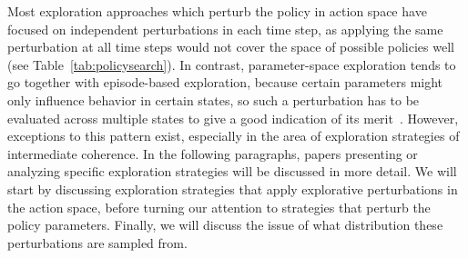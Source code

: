 Most exploration approaches which perturb the policy in action space have focused on independent perturbations in each time step, as applying the same perturbation at all time steps would not cover the space of possible policies well (see Table~\ref{tab:policysearch}). In contrast, parameter-space exploration tends to go together with episode-based exploration, because certain parameters might only influence behavior in certain states, so such a perturbation has to be evaluated across multiple states to give a good indication of its merit~. However, exceptions to this pattern exist, especially in the area of exploration strategies of intermediate coherence. In the following paragraphs, papers presenting or analyzing specific exploration strategies will be discussed in more detail. We will start by discussing exploration strategies that apply explorative perturbations in the action space, before turning our attention to strategies that perturb the policy parameters. Finally, we will discuss the issue of what distribution these perturbations are sampled from.

